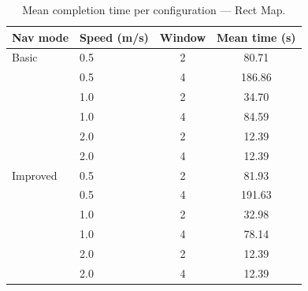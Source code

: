 \begin{table}
    \centering
    \begin{tabular}{llcc}
        \hline
        \textbf{Nav mode} & \textbf{Speed (m/s)} & \textbf{Window} & \textbf{Mean time (s)} \\
        \hline
        Basic             & 0.5                  & 2               & 80.71                  \\
                          & 0.5                  & 4               & 186.86                 \\
                          & 1.0                  & 2               & 34.70                  \\
                          & 1.0                  & 4               & 84.59                  \\
                          & 2.0                  & 2               & 12.39                  \\
                          & 2.0                  & 4               & 12.39                  \\
        Improved          & 0.5                  & 2               & 81.93                  \\
                          & 0.5                  & 4               & 191.63                 \\
                          & 1.0                  & 2               & 32.98                  \\
                          & 1.0                  & 4               & 78.14                  \\
                          & 2.0                  & 2               & 12.39                  \\
                          & 2.0                  & 4               & 12.39                  \\
        \hline
    \end{tabular}
    \caption{Mean completion time per configuration --- Rect Map.}
    \label{tab:rect_map}
\end{table}

